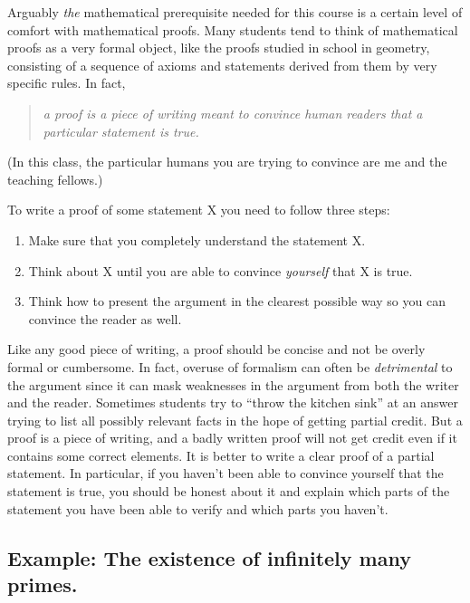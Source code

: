 Arguably \emph{the} mathematical prerequisite needed for this course is
a certain level of comfort with mathematical proofs. Many students tend
to think of mathematical proofs as a very formal object, like the proofs
studied in school in geometry, consisting of a sequence of axioms and
statements derived from them by very specific rules. In fact,

\begin{quote}
\emph{a proof is a piece of writing meant to convince human readers that
a particular statement is true.}
\end{quote}

(In this class, the particular humans you are trying to convince are me
and the teaching fellows.)

To write a proof of some statement X you need to follow three steps:

\begin{enumerate}
\def\labelenumi{\arabic{enumi}.}
\item
  Make sure that you completely understand the statement X.
\item
  Think about X until you are able to convince \emph{yourself} that X is
  true.
\item
  Think how to present the argument in the clearest possible way so you
  can convince the reader as well.
\end{enumerate}

Like any good piece of writing, a proof should be concise and not be
overly formal or cumbersome. In fact, overuse of formalism can often be
\emph{detrimental} to the argument since it can mask weaknesses in the
argument from both the writer and the reader. Sometimes students try to
``throw the kitchen sink'' at an answer trying to list all possibly
relevant facts in the hope of getting partial credit. But a proof is a
piece of writing, and a badly written proof will not get credit even if
it contains some correct elements. It is better to write a clear proof
of a partial statement. In particular, if you haven't been able to
convince yourself that the statement is true, you should be honest about
it and explain which parts of the statement you have been able to verify
and which parts you haven't.

\subsection{Example: The existence of infinitely many
primes.}\label{Example-The-existence-of-}

